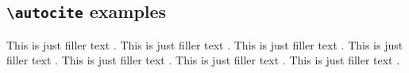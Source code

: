\documentclass[a4paper]{article}
\newcommand{\cmd}[1]{\texttt{\textbackslash #1}}
\begin{document}
\subsection*{\cmd{autocite} examples}


This is just filler text \autocite{aristotle:rhetoric}.
This is just filler text \autocite{averroes/bland}.
This is just filler text \autocite{aristotle:rhetoric}.
This is just filler text \autocite{aristotle:anima}.
This is just filler text \autocite{aristotle:anima}.
This is just filler text \autocite{aristotle:physics}.
This is just filler text \autocite{aristotle:physics}.

\clearpage


\printshorthands
\printbibliography
\end{document}
